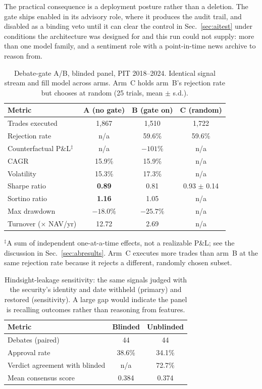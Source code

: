 \documentclass[10pt,twocolumn]{IEEEtran}
\begin{document}
The practical consequence is a deployment posture rather than a deletion. The
gate ships enabled in its advisory role, where it produces the audit trail, and
disabled as a binding veto until it can clear the control in
Sec.~\ref{sec:aitest} under conditions the architecture was designed for and
this run could not supply: more than one model family, and a sentiment role
with a point-in-time news archive to reason from.

\begin{table}[t]
\caption{Debate-gate A/B, blinded panel, PIT 2018--2024. Identical signal
stream and fill model across arms. Arm~C holds arm~B's rejection rate but
chooses at random (25 trials, mean $\pm$ s.d.).}
\label{tab:abtest}
\centering
\setlength{\tabcolsep}{4pt}
\footnotesize
\begin{tabular}{lccc}
\toprule
Metric & A (no gate) & B (gate on) & C (random) \\
\midrule
Trades executed & 1{,}867 & 1{,}510 & 1{,}722 \\
Rejection rate & n/a & 59.6\% & 59.6\% \\
Counterfactual P\&L$^\ddagger$ & n/a & $-101\%$ & n/a \\
CAGR & 15.9\% & 15.9\% & n/a \\
Volatility & 15.3\% & 17.3\% & n/a \\
Sharpe ratio & \textbf{0.89} & 0.81 & 0.93 $\pm$ 0.14 \\
Sortino ratio & \textbf{1.16} & 1.05 & n/a \\
Max drawdown & $\mathbf{-18.0\%}$ & $-25.7\%$ & n/a \\
Turnover ($\times$ NAV/yr) & 12.72 & 2.69 & n/a \\
\bottomrule
\end{tabular}

\vspace{2pt}
{\footnotesize $^\ddagger$A sum of independent one-at-a-time effects, not a
realizable P\&L; see the discussion in Sec.~\ref{sec:abresults}. Arm~C executes
more trades than arm~B at the same rejection rate because it rejects a
different, randomly chosen subset.}
\end{table}

\begin{table}[t]
\caption{Hindsight-leakage sensitivity: the same signals judged with the
security's identity and date withheld (primary) and restored (sensitivity).
A large gap would indicate the panel is recalling outcomes rather than
reasoning from features.}
\label{tab:leak}
\centering
\begin{tabular}{lcc}
\toprule
Metric & Blinded & Unblinded \\
\midrule
Debates (paired) & 44 & 44 \\
Approval rate & 38.6\% & 34.1\% \\
Verdict agreement with blinded & n/a & 72.7\% \\
Mean consensus score & 0.384 & 0.374 \\
\bottomrule
\end{tabular}
\end{table}
\end{document}

